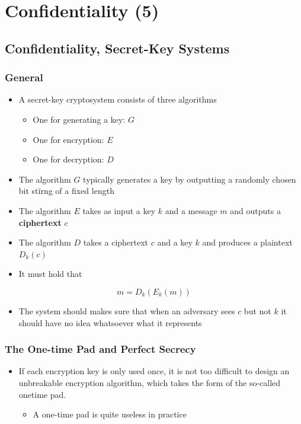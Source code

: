 \documentclass[11pt]{article}
\begin{document}
\section{Confidentiality (5)}
\label{sec:org3d54c54}
\subsection{Confidentiality, Secret-Key Systems}
\label{sec:org10dd29e}
\subsubsection{General}
\label{sec:orgbb9ebe2}
\begin{itemize}
\item A secret-key cryptosystem consists of three algorithms
\begin{itemize}
\item One for generating a key: \(G\)
\item One for encryption: \(E\)
\item One for decryption: \(D\)
\end{itemize}

\item The algorithm \(G\) typically generates a key by outputting a randomly chosen bit stïrng of a fixed length
\item The algorithm \(E\) takes as input a key \(k\) and a message \(m\) and outputs a \textbf{ciphertext} \(c\)
\item The algorithm \(D\) takes a ciphertext \(c\) and a key \(k\) and produces a plaintext \(D_k(c)\)
\item It must hold that
\end{itemize}
\begin{equation}
  m=D_k(E_k(m))
\end{equation}

\begin{itemize}
\item The system should makes sure that when an adversary sees \(c\) but not \(k\) it should have no idea whatsoever what it represents
\end{itemize}

\subsubsection{The One-time Pad and Perfect Secrecy}
\label{sec:orgd506e21}
\begin{itemize}
\item If each encryption key is only used once, it is not too difficult to design an unbreakable encryption algorithm, which takes the form of the so-called onetime pad.
\begin{itemize}
\item A one-time pad is quite useless in practice
\end{itemize}
\end{itemize}
\end{document}
